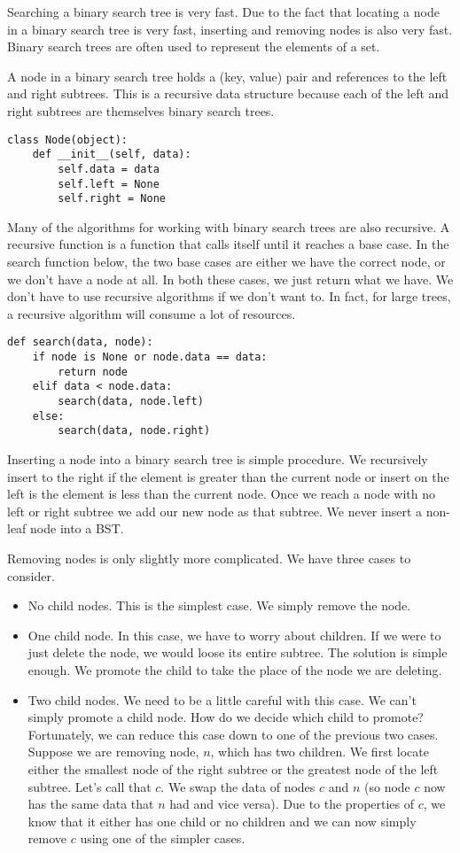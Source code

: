 Searching a binary search tree is very fast.
Due to the fact that locating a node in a binary search tree is very fast, inserting and removing nodes is also very fast.  
Binary search trees are often used to represent the elements of a set.

A node in a binary search tree holds a (key, value) pair and references to the left and right subtrees. 
This is a recursive data structure because each of the left and right subtrees are themselves binary search trees.
\begin{lstlisting}
class Node(object):
    def __init__(self, data):
        self.data = data
        self.left = None
        self.right = None
\end{lstlisting}
Many of the algorithms for working with binary search trees are also recursive.
A recursive function is a function that calls itself until it reaches a base case.
In the search function below, the two base cases are either we have the correct
node, or we don't have a node at all. 
In both these cases, we just return what we have.
We don't have to use recursive algorithms if we don't want to.  In fact, for large trees, a recursive algorithm will consume a lot of resources.
\begin{lstlisting}
def search(data, node):
    if node is None or node.data == data:
        return node
    elif data < node.data:
        search(data, node.left)
    else:
        search(data, node.right)
\end{lstlisting}

Inserting a node into a binary search tree is simple procedure.
We recursively insert to the right if the element is greater than the current node
or insert on the left is the element is less than the current node.
Once we reach a node with no left or right subtree we add our new node as that subtree.
We never insert a non-leaf node into a BST.

Removing nodes is only slightly more complicated.
We have three cases to consider.
\begin{itemize}
\item No child nodes.  This is the simplest case.  We simply remove the node.
\item One child node.  In this case, we have to worry about children.
If we were to just delete the node, we would loose its entire subtree.
The solution is simple enough. 
We promote the child to take the place of the node we are deleting.
\item Two child nodes.  We need to be a little careful with this case.
We can't simply promote a child node.  How do we decide which child to promote?
Fortunately, we can reduce this case down to one of the previous two cases.
Suppose we are removing node, $n$, which has two children.
We first locate either the smallest node of the right subtree or the greatest node of the left subtree.
Let's call that $c$.
We swap the data of nodes $c$ and $n$ (so node $c$ now has the same data that $n$ had and vice versa).
Due to the properties of $c$, we know that it either has one child or no children and we can now simply remove $c$ using one of the simpler cases.
\end{itemize}

